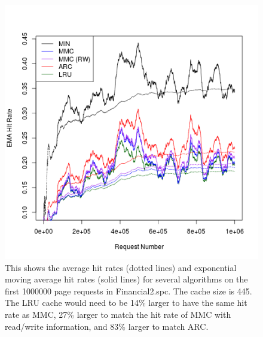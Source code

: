   \begin{figure}
  \centering
  \includegraphics[width=6in]{../media/ts_445_445_1780_3.png}
  \caption[Rolling hit rate for 445 page caches on trace Financial2.spc]{This
  shows the average hit rates (dotted lines) and exponential moving average hit
  rates (solid lines) for several algorithms on the first 1000000 page requests
  in Financial2.spc. The cache size is 445. The LRU cache would need to be 14\%
  larger to have the same hit rate as MMC, 27\% larger to match the hit rate of
  MMC with read/write information, and 83\% larger to match ARC.}
  \label{fig:ts_445_financial2}
  \end{figure}

